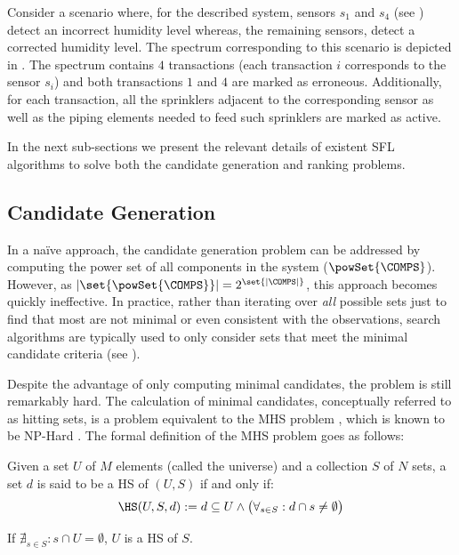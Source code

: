 Consider a scenario where, for the described system, sensors $s_1$ and
$s_4$ (see ) detect an incorrect
humidity level whereas, the remaining sensors, detect a corrected
humidity level.
%
The spectrum corresponding to this scenario is depicted in
.
%
The spectrum contains $4$ transactions (each transaction $i$
corresponds to the sensor $s_i$) and both transactions $1$ and $4$ are
marked as erroneous.
%
Additionally, for each transaction, all the sprinklers adjacent to the
corresponding sensor as well as the piping elements needed to feed
such sprinklers are marked as active.



In the next sub-sections we present the relevant details of existent
\ac{SFL} algorithms to solve both the candidate generation and ranking
problems.


\subsection{Candidate Generation}
\label{sec:intro:candidate-generation}
In a na\"{i}ve approach, the candidate generation problem can be
addressed by computing the power set of all components in the system
($\powSet{\COMPS}$).
%
However, as $|\set{\powSet{\COMPS}}| = 2^{\set{|\COMPS|}}$, this
approach becomes quickly ineffective.
%
In practice, rather than iterating over \emph{all} possible sets just
to find that most are not minimal or even consistent with the
observations, search algorithms are typically used to only consider
sets that meet the minimal candidate criteria (see
).
%

Despite the advantage of only computing minimal candidates, the
problem is still remarkably hard.
%
The calculation of minimal candidates, conceptually referred to as
hitting sets, is a problem equivalent to the \acl{MHS} problem
\citep{Reiter87}, which is known to be NP-Hard \citep{Garey90}.
%
The formal definition of the \acl{MHS} problem goes as follows:

\begin{definition}
  \label{def:intro:hitting-set}
  Given a set $U$ of $M$ elements (called the universe) and a
  collection $S$ of $N$ sets, a set $d$ is said to be a \acf{HS} of
  $(U,S)$ if and only if:
  \begin{equation}
    \label{eq:intro:hitting-set}
    \displaystyle \HS(U,S,d):= d \subseteq U \wedge \big(\forall_{s \in S}: d \cap s \not = \emptyset\big)
  \end{equation}
\end{definition}
\begin{corollary}
  If $\nexists_{s \in S} : s \cap U = \emptyset$, $U$ is a \ac{HS} of $S$.
\end{corollary}

